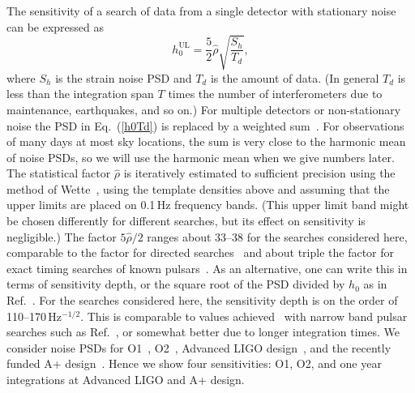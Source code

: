 \documentclass{ttuthes2007}
\begin{document}
The sensitivity of a search of data from a single detector with stationary
noise can be expressed as~\cite{Wette:2011eu}
\begin{equation}
\label{h0Td}
h_0^\mathrm{UL} = \frac{5}{2} \hat\rho \sqrt{ \frac{S_h} {T_d} },
\end{equation}
where $S_h$ is the strain noise \ac{PSD} and $T_d$ is the amount of data.
(In general $T_d$ is less than the integration span $T$ times the number of
interferometers due to maintenance, earthquakes, and so on.)
For multiple detectors or non-stationary noise the \ac{PSD} in
Eq.~(\ref{h0Td}) is replaced by a weighted sum~\cite{Jaranowski:1998qm,
Cutler:2005hc}.
For observations of many days at most sky locations, the sum is very close to
the harmonic mean of noise \acp{PSD}, so we will use the harmonic mean when we
give numbers later.
The statistical factor $\hat\rho$ is iteratively estimated to sufficient
precision using the method of Wette~\cite{Wette:2011eu}, using the template
densities above and assuming that the upper limits are placed on 0.1\,Hz
frequency bands.
(This upper limit band might be chosen differently for different searches, but
its effect on sensitivity is negligible.)
The factor $5\hat\rho/2$ ranges about 33--38 for the searches considered here,
comparable to the factor for directed searches~\cite{Abbott:2018qee} and about
triple the factor for exact timing searches of known
pulsars~\cite{Authors:2019ztc}.
As an alternative, one can write this in terms of sensitivity depth, or the
square root of the \ac{PSD} divided by $h_0$ as in
Ref.~\cite{Dreissigacker:2018afk}.
For the searches considered here, the sensitivity depth is on the order of
110--170\,Hz$^{-1/2}.$
This is comparable to values achieved~\cite{Dreissigacker:2018afk} with narrow
band pulsar searches such as Ref.~\cite{Abbott:2019bed}, or somewhat better
due to longer integration times.
We consider noise \acp{PSD} for \ac{O1}~\cite{H1O1, L1O1}, \ac{O2}~\cite{H1O2,
L1O2}, Advanced LIGO design~\cite{Design}, and the recently funded A+
design~\cite{A+}.
Hence we show four sensitivities:
\ac{O1}, \ac{O2}, and one year integrations at Advanced LIGO and A+ design.
\end{document}
